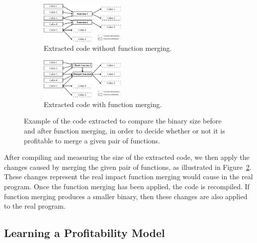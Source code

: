 \begin{figure}[h]
\centering
\begin{subfigure}
\centering
  \includegraphics[width=0.45\textwidth]{figs/our-cost-model-callgraph-1.pdf}
  \caption{Extracted code without function merging.}
  \label{fig:our-cost-model-callgraph-1}
\end{subfigure}
\begin{subfigure}
\centering
  \includegraphics[width=0.45\textwidth]{figs/our-cost-model-callgraph-2.pdf}
  \caption{Extracted code with function merging.}
  \label{fig:our-cost-model-callgraph-2}
\end{subfigure}
\caption{Example of the code extracted to compare the binary size before and after function merging, in order to decide whether or not it is profitable to merge a given pair of functions.}
\label{fig:our-cost-model-callgraphs}
\end{figure}

After compiling and measuring the size of the extracted code, we then apply the changes caused by merging the given pair of functions, as illustrated in Figure~\ref{fig:our-cost-model-callgraph-2}.
These changes represent the real impact function merging would cause in the real program.
Once the function merging has been applied, the code is recompiled.
If function merging produces a smaller binary, then these changes are also applied to the real program.

\subsection{Learning a Profitability Model}

